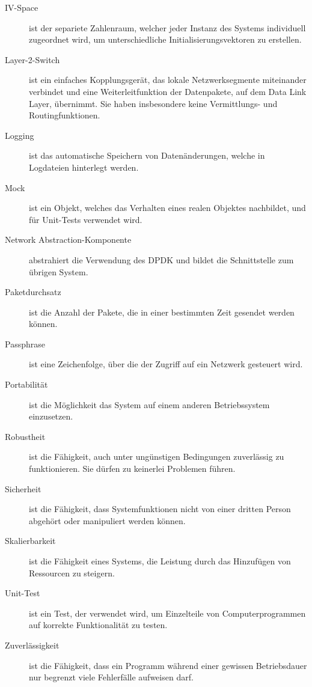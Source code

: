 \documentclass[a4paper, 11pt, ngerman, fleqn]{article}
\begin{document}
\begin{description}
	\item[IV-Space] ist der separiete Zahlenraum, welcher jeder Instanz des Systems individuell zugeordnet wird, um unterschiedliche Initialisierungsvektoren zu erstellen.
	
	\item[Layer-2-Switch] ist ein einfaches Kopplungsgerät, das lokale Netzwerksegmente miteinander verbindet und eine Weiterleitfunktion der Datenpakete, auf dem Data Link Layer, übernimmt. 
	Sie haben insbesondere keine Vermittlungs- und Routingfunktionen.  
	
	\item[Logging] ist das automatische Speichern von Datenänderungen, welche in Logdateien hinterlegt werden.
	
	\item[Mock] ist ein Objekt, welches das Verhalten eines realen Objektes nachbildet, und für Unit-Tests verwendet wird.
	
	\item[Network Abstraction-Komponente] abstrahiert die Verwendung des DPDK und bildet die Schnittstelle zum übrigen System.
	
	\item[Paketdurchsatz] ist die Anzahl der Pakete, die in einer bestimmten Zeit gesendet werden können.
	
	\item[Passphrase] ist eine Zeichenfolge, über die der Zugriff auf ein Netzwerk gesteuert wird.
	
	\item[Portabilität] ist die Möglichkeit das System auf einem anderen Betriebssystem einzusetzen.
	
	\item[Robustheit] ist die Fähigkeit, auch unter ungünstigen Bedingungen zuverlässig zu funktionieren. Sie dürfen zu keinerlei Problemen führen.
	
	\item[Sicherheit] ist die Fähigkeit, dass Systemfunktionen nicht von einer dritten Person abgehört oder manipuliert werden können.
	
	\item[Skalierbarkeit] ist die Fähigkeit eines Systems, die Leistung durch das Hinzufügen von Ressourcen zu steigern.
	
	\item[Unit-Test] ist ein Test, der verwendet wird, um Einzelteile von Computerprogrammen auf korrekte Funktionalität zu testen.
	
	\item[Zuverlässigkeit] ist die Fähigkeit, dass ein Programm während einer gewissen Betriebsdauer nur begrenzt viele Fehlerfälle aufweisen darf.
	

\end{description}
\end{document}
